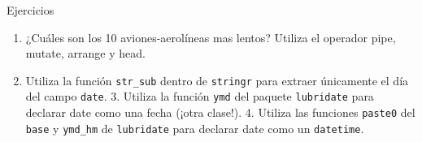 \documentclass[]{article}
\begin{document}
\renewcommand\bcStyleTitre[1]{\large\textcolor{bbblack}{#1}}

\begin{bclogo}[
  couleur=llred,
  arrondi=0,
  logo=\bcstop,
  barre=none,
  noborder=true]{Ejercicios}
\begin{enumerate}
\item ¿Cuáles son los 10 aviones-aerolíneas mas lentos? Utiliza el operador pipe, 
mutate, arrange y head.
\item Utiliza la función \texttt{str\_sub} dentro de \texttt{stringr} para extraer únicamente el 
día del campo \texttt{date}.
3. Utiliza la función \texttt{ymd} del paquete \texttt{lubridate} para declarar date como una
fecha (¡otra clase!).
4. Utiliza las funciones \texttt{paste0} del \texttt{base} y \texttt{ymd\_hm} de \texttt{lubridate} para
declarar date como un \texttt{datetime}.
\end{enumerate}
\end{bclogo}
\end{document}
